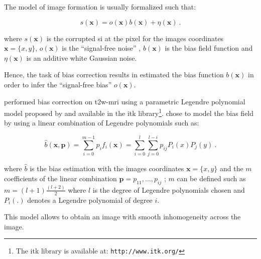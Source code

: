 \begin{enumerate}[leftmargin=*]
The model of image formation is usually formalized such that:

\begin{equation}
	s(\mathbf{x}) = o(\mathbf{x})b(\mathbf{x}) + \eta(\mathbf{x}) \ .
	\label{eq:biasmodel}
\end{equation}

\noindent where $s(\mathbf{x})$ is the corrupted \ac{si} at the pixel for the images coordinates $\mathbf{x} = \{x,y\}$, $o(\mathbf{x})$ is the ``signal-free noise'' , $b(\mathbf{x})$ is the bias field function and $\eta(\mathbf{x})$ is an additive white Gaussian noise.
%
%
%

Hence, the task of bias correction results in estimated the bias function $b(\mathbf{x})$ in order to infer the ``signal-free bias'' $o(\mathbf{x})$.%

\cite{Viswanath2009} performed bias correction on \ac{t2w}-\ac{mri} using a parametric Legendre polynomial model proposed by \cite{Styner2000} and available in the \ac{itk} library\footnote{The \ac{itk} library is available at: \texttt{http://www.itk.org/}}. \cite{Styner2000} chose to model the bias field by using a linear combination of Legendre polynomials such as:

\begin{equation}
	\hat{b}(\mathbf{x},\mathbf{p}) = \sum_{i=0}^{m-1} p_i f_i(\mathbf{x}) =  \sum_{i=0}^{l} \sum_{j=0}^{l-i} p_{ij} P_i(x) P_j(y) \ .
	\label{eq:biascorr}
\end{equation}

\noindent where $\hat{b}$ is the bias estimation with the images coordinates $\mathbf{x} = \{x,y\}$ and the $m$ coefficients of the linear combination $\mathbf{p} = {p_{11},\dotsc,p_{ij}}$ ; $m$ can be defined such as $m=(l+1)\frac{(l+2)}{2}$ where $l$ is the degree of Legendre polynomials chosen and $P_i(.)$ denotes a Legendre polynomial of degree $i$.

This model allows to obtain an image with smooth inhomogeneity across the image.


\end{enumerate}
